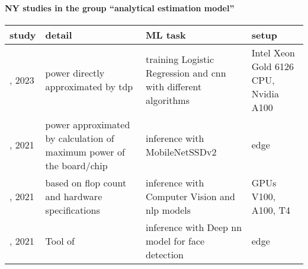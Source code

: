 \paragraph{NY studies in the group ``analytical estimation model''} 
 \label{tab:NY-analytical-estimation-model} 
\begin{longtable}{|>{\raggedright\arraybackslash}p{0.85cm}|p{4cm}|p{6cm}|>{\raggedright\arraybackslash}p{3.75cm}|}
\toprule
\bfseries study & \bfseries detail & \bfseries ML task & \bfseries setup \\
\midrule 
\endhead
\cite{wu2023}, 2023 & power directly approximated by \acrshort{tdp} & training Logistic Regression and \acrshort{cnn} with different algorithms & Intel Xeon Gold 6126 CPU, Nvidia A100 \\
\cite{arnautovic2021}, 2021 & power approximated by calculation of maximum power of the board/chip & inference with MobileNetSSDv2  & edge \\
\cite{desislavov2021}, 2021 & based on \acrshort{flop} count and hardware specifications & inference with Computer Vision and \acrshort{nlp} models & GPUs V100, A100, T4 \\
\cite{canilang2021}, 2021 & Tool of \cite{yang2017} & inference with Deep \acrshort{nn} model for face detection & edge \\
\bottomrule
\end{longtable}
